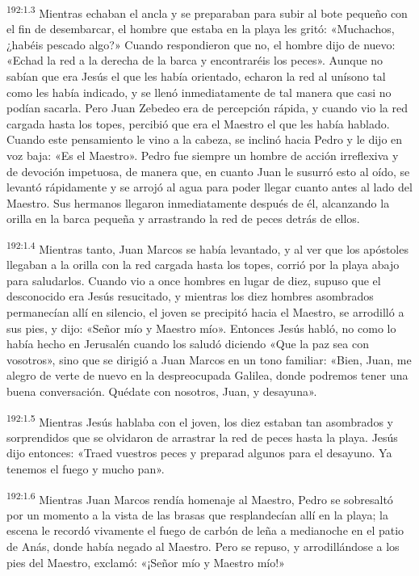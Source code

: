 \par 
\textsuperscript{192:1.3} Mientras echaban el ancla y se preparaban para subir al bote pequeño con el fin de desembarcar, el hombre que estaba en la playa les gritó: «Muchachos, ¿habéis pescado algo?» Cuando respondieron que no, el hombre dijo de nuevo: «Echad la red a la derecha de la barca y encontraréis los peces». Aunque no sabían que era Jesús el que les había orientado, echaron la red al unísono tal como les había indicado, y se llenó inmediatamente de tal manera que casi no podían sacarla. Pero Juan Zebedeo era de percepción rápida, y cuando vio la red cargada hasta los topes, percibió que era el Maestro el que les había hablado. Cuando este pensamiento le vino a la cabeza, se inclinó hacia Pedro y le dijo en voz baja: «Es el Maestro». Pedro fue siempre un hombre de acción irreflexiva y de devoción impetuosa, de manera que, en cuanto Juan le susurró esto al oído, se levantó rápidamente y se arrojó al agua para poder llegar cuanto antes al lado del Maestro. Sus hermanos llegaron inmediatamente después de él, alcanzando la orilla en la barca pequeña y arrastrando la red de peces detrás de ellos.

\par 
\textsuperscript{192:1.4} Mientras tanto, Juan Marcos se había levantado, y al ver que los apóstoles llegaban a la orilla con la red cargada hasta los topes, corrió por la playa abajo para saludarlos. Cuando vio a once hombres en lugar de diez, supuso que el desconocido era Jesús resucitado, y mientras los diez hombres asombrados permanecían allí en silencio, el joven se precipitó hacia el Maestro, se arrodilló a sus pies, y dijo: «Señor mío y Maestro mío». Entonces Jesús habló, no como lo había hecho en Jerusalén cuando los saludó diciendo «Que la paz sea con vosotros», sino que se dirigió a Juan Marcos en un tono familiar: «Bien, Juan, me alegro de verte de nuevo en la despreocupada Galilea, donde podremos tener una buena conversación. Quédate con nosotros, Juan, y desayuna».

\par 
\textsuperscript{192:1.5} Mientras Jesús hablaba con el joven, los diez estaban tan asombrados y sorprendidos que se olvidaron de arrastrar la red de peces hasta la playa. Jesús dijo entonces: «Traed vuestros peces y preparad algunos para el desayuno. Ya tenemos el fuego y mucho pan».

\par 
\textsuperscript{192:1.6} Mientras Juan Marcos rendía homenaje al Maestro, Pedro se sobresaltó por un momento a la vista de las brasas que resplandecían allí en la playa; la escena le recordó vivamente el fuego de carbón de leña a medianoche en el patio de Anás, donde había negado al Maestro. Pero se repuso, y arrodillándose a los pies del Maestro, exclamó: «¡Señor mío y Maestro mío!»

